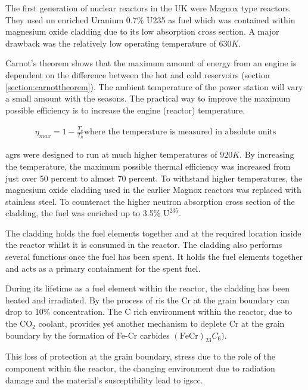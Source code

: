The first generation of nuclear reactors in the UK were Magnox type reactors.  They used un enriched Uranium 0.7\% U235 as fuel which was contained within magnesium oxide cladding due to its low absorption cross section.  A major drawback was the relatively low operating temperature of $630K$.

Carnot's theorem shows that the maximum amount of energy from an engine is dependent on the difference between the hot and cold reservoirs (section \ref{section:carnottheorem}).  The ambient temperature of the power station will vary a small amount with the seasons.  The practical way to improve the maximum possible efficiency is to increase the engine (reactor) temperature.

\begin{equation}
\begin{split}
\eta_{max} = 1 - \frac{T_c}{T_h}
\text{where the temperature is measured in absolute units}
\end{split}
\end{equation}

\acrshort{agr}s were designed to run at much higher temperatures of $920K$.  By increasing the temperature, the maximum possible thermal efficiency was increased from just over 50 percent to almost 70 percent.  To withstand higher temperatures, the magnesium oxide cladding used in the earlier Magnox reactors was replaced with stainless steel.  To counteract the higher neutron absorption cross section of the cladding, the fuel was enriched up to 3.5\% $\text{U}^{235}$.

The cladding holds the fuel elements together and at the required location inside the reactor whilst it is consumed in the reactor.  The cladding also performs several functions once the fuel has been spent.  It holds the fuel elements together and acts as a primary containment for the spent fuel\cite{agrfuelstorage}.

During its lifetime as a fuel element within the reactor, the cladding has been heated and irradiated.  By the process of \acrshort{ris} the Cr at the grain boundary can drop to 10\% concentration\cite{agrigscc}.  The C rich environment within the reactor, due to the $\text{CO}_{2}$ coolant, provides yet another mechanism to deplete Cr at the grain boundary by the formation of Fe-Cr carbides $(\text{Fe}\text{Cr})_{23} C_{6})$.  

This loss of protection at the grain boundary, stress due to the role of the component within the reactor, the changing environment due to radiation damage and the material's susceptibility lead to \acrshort{igscc}.




